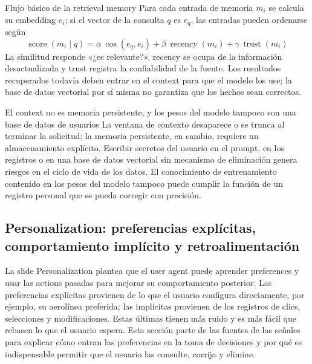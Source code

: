 \documentclass[a4paper]{article}
\begin{document}
\begin{importantbox}{Flujo básico de la retrieval memory}
Para cada entrada de memoria $m_i$ se calcula su embedding $e_i$; si el vector de la consulta $q$ es $e_q$, las entradas pueden ordenarse según
\[
\operatorname{score}(m_i\mid q)
=\alpha\,\cos(e_q,e_i)
+\beta\,\operatorname{recency}(m_i)
+\gamma\,\operatorname{trust}(m_i)
\]
La similitud responde «¿es relevante?», recency se ocupa de la información desactualizada y trust registra la confiabilidad de la fuente. Los resultados recuperados todavía deben entrar en el context para que el modelo los use; la base de datos vectorial por sí misma no garantiza que los hechos sean correctos.
\end{importantbox}

\begin{warningbox}{El context no es memoria persistente, y los pesos del modelo tampoco son una base de datos de usuarios}
La ventana de contexto desaparece o se trunca al terminar la solicitud; la memoria persistente, en cambio, requiere un almacenamiento explícito. Escribir secretos del usuario en el prompt, en los registros o en una base de datos vectorial sin mecanismo de eliminación genera riesgos en el ciclo de vida de los datos. El conocimiento de entrenamiento contenido en los pesos del modelo tampoco puede cumplir la función de un registro personal que se pueda corregir con precisión.
\end{warningbox}


\subsection{Personalization: preferencias explícitas, comportamiento implícito y retroalimentación}

La slide Personalization plantea que el user agent puede aprender preferences y usar las actions pasadas para mejorar su comportamiento posterior. Las preferencias explícitas provienen de lo que el usuario configura directamente, por ejemplo, su aerolínea preferida; las implícitas provienen de los registros de clics, selecciones y modificaciones. Estas últimas tienen más ruido y es más fácil que rebasen lo que el usuario espera. Esta sección parte de las fuentes de las señales para explicar cómo entran las preferencias en la toma de decisiones y por qué es indispensable permitir que el usuario las consulte, corrija y elimine.
\end{document}
